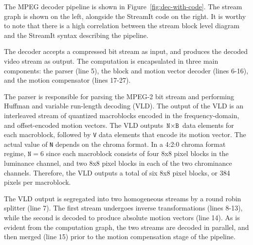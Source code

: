 \begin{figure*}[t]
  \centerline{}
  \caption{MPEG-2 decoder block diagram and corresponding StreamIt code.}
  \label{fig:dec-with-code}
\end{figure*}


The MPEG decoder pipeline is shown in
Figure~\ref{fig:dec-with-code}. The stream graph is shown on the left,
alongside the StreamIt code on the right. It is worthy to note that
there is a high correlation between the stream block level diagram and
the StreamIt syntax describing the pipeline.

The decoder accepts a compressed bit stream as input, and produces the
decoded video stream as output. The computation is encapsulated in
three main components: the parser (line 5), the block and motion vector
decoder (lines 6-16), and the motion compensator (lines 17-27).

The parser is responsible for parsing the MPEG-2 bit stream and
performing Huffman and variable run-length decoding (VLD). The output
of the VLD is an interleaved stream of quantized macroblocks encoded
in the frequency-domain, and offset-encoded motion vectors. The VLD
outputs $\texttt{N}\times\texttt{B}$ data elements for each
macroblock, followed by \texttt{V} data elements that encode its
motion vector. The actual value of \texttt{N} depends on the chroma
format. In a 4:2:0 chroma format regime, $\texttt{N}=6$ since each
macroblock consists of four 8x8 pixel blocks in the luminance channel,
and two 8x8 pixel blocks in each of the two chrominance
channels. Therefore, the VLD outputs a total of six 8x8 pixel blocks,
or 384 pixels per macroblock.

The VLD output is segregated into two homogeneous streams by a
round robin splitter (line 7). The first stream undergoes inverse
transformations (lines 8-13), while the second is decoded to produce
absolute motion vectors (line 14). As is evident from the computation
graph, the two streams are decoded in parallel, and then merged (line
15) prior to the motion compensation stage of the pipeline.

